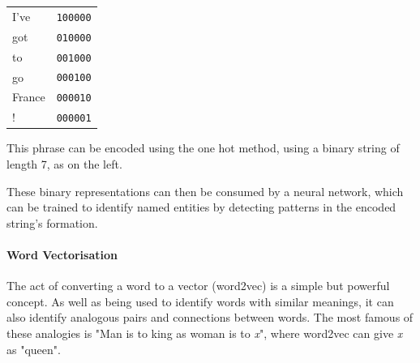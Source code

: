 \begin{minipage}{0.25\textwidth}
\begin{tabular}{ll}
I've   & \texttt{100000} \\
got	   & \texttt{010000} \\
to	   & \texttt{001000} \\  
go 	   & \texttt{000100} \\  
France & \texttt{000010} \\  
!	   & \texttt{000001} \\  
\end{tabular}
\end{minipage}
\begin{minipage}{0.68\textwidth}
This phrase can be encoded using the one hot method, using a binary string of length 7, as on the left.

These binary representations can then be consumed by a neural network, which can be trained to identify named entities by detecting patterns in the encoded string's formation.

\end{minipage}

\paragraph{Word Vectorisation}\label{lit:word2vec}

The act of converting a word to a vector (word2vec) is a simple but powerful concept. As well as being used to identify words with similar meanings, it can also identify analogous pairs and connections between words. The most famous of these analogies is "Man is to king as woman is to \textit{x}", where word2vec can give \textit{x} as "queen". \cite{church2017}


\begin{minipage}{1.5in}

\end{minipage}

